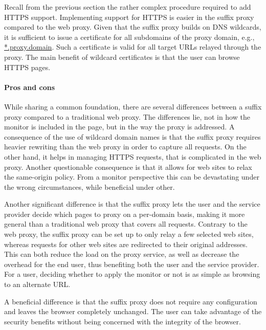 \documentclass{llncs}
\begin{document}
Recall from the previous section the rather complex procedure required to add HTTPS support.
Implementing support for HTTPS is easier in the suffix proxy compared to the web proxy. 
Given that the suffix proxy builds on DNS wildcards, it is sufficient to issue a certificate
for all subdomains of the proxy domain, e.g., \url{*.proxy.domain}. Such a 
certificate is valid for all target URLs relayed through the proxy.
The main benefit of wildcard certificates is that the user can browse HTTPS pages. 

\paragraph{Pros and cons}

While sharing a common foundation, there are several differences between a 
suffix proxy compared to a traditional web proxy. The differences lie, not in 
how the monitor is included in the page, but in the way the proxy is 
addressed. A consequence of the use of wildcard domain names is that the suffix proxy requires 
heavier rewriting than the web proxy in order to capture all requests. On the other 
hand, it helps in managing HTTPS requests, that is complicated in the web proxy.
Another questionable consequence is that it allows for web sites to relax the 
same-origin policy. From a monitor perspective this can be devastating under the wrong circumstances, 
while beneficial under other.

Another significant difference is that the suffix proxy lets the user and the 
service provider decide which pages to proxy on a per-domain basis, making it 
more general than a traditional web proxy that covers all requests. 
Contrary to the web proxy, the suffix proxy can be set up to only relay a few selected 
web sites, whereas requests for other web sites are redirected to their original 
addresses. This can both reduce the load on the proxy service, as well as decrease the 
overhead for the end user, thus benefiting both the user and the service provider.
For a user, deciding whether to apply the monitor or not is as simple as browsing 
to an alternate URL.

A beneficial difference is that the suffix proxy does not require any 
configuration and leaves the browser completely unchanged. The user can take
advantage of the security benefits without being concerned with the integrity 
of the browser.
\end{document}
